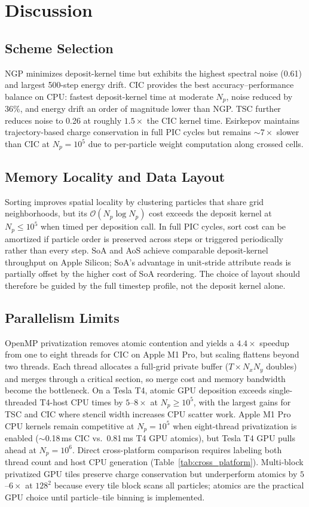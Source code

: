 \section{Discussion}

\subsection{Scheme Selection}
NGP minimizes deposit-kernel time but exhibits the highest spectral noise (0.61) and largest 500-step energy drift.
CIC provides the best accuracy--performance balance on CPU: fastest deposit-kernel time at moderate $N_p$, noise reduced by 36\%, and energy drift an order of magnitude lower than NGP.
TSC further reduces noise to 0.26 at roughly $1.5\times$ the CIC kernel time.
Esirkepov maintains trajectory-based charge conservation in full PIC cycles but remains $\sim 7\times$ slower than CIC at $N_p=10^5$ due to per-particle weight computation along crossed cells.

\subsection{Memory Locality and Data Layout}
Sorting improves spatial locality by clustering particles that share grid neighborhoods, but its $\mathcal{O}(N_p \log N_p)$ cost exceeds the deposit kernel at $N_p \leq 10^5$ when timed per deposition call.
In full PIC cycles, sort cost can be amortized if particle order is preserved across steps or triggered periodically rather than every step.
SoA and AoS achieve comparable deposit-kernel throughput on Apple Silicon; SoA's advantage in unit-stride attribute reads is partially offset by the higher cost of SoA reordering.
The choice of layout should therefore be guided by the full timestep profile, not the deposit kernel alone.

\subsection{Parallelism Limits}
OpenMP privatization removes atomic contention and yields a $4.4\times$ speedup from one to eight threads for CIC on Apple M1 Pro, but scaling flattens beyond two threads.
Each thread allocates a full-grid private buffer ($T \times N_x N_y$ doubles) and merges through a critical section, so merge cost and memory bandwidth become the bottleneck.
On a Tesla T4, atomic GPU deposition exceeds single-threaded T4-host CPU times by $5$--$8\times$ at $N_p \geq 10^5$, with the largest gains for TSC and CIC where stencil width increases CPU scatter work.
Apple M1 Pro CPU kernels remain competitive at $N_p=10^5$ when eight-thread privatization is enabled ($\sim$0.18\,ms CIC vs.\ 0.81\,ms T4 GPU atomics), but Tesla T4 GPU pulls ahead at $N_p=10^6$.
Direct cross-platform comparison requires labeling both thread count and host CPU generation (Table~\ref{tab:cross_platform}).
Multi-block privatized GPU tiles preserve charge conservation but underperform atomics by $5$--$6\times$ at $128^2$ because every tile block scans all particles; atomics are the practical GPU choice until particle--tile binning is implemented.

